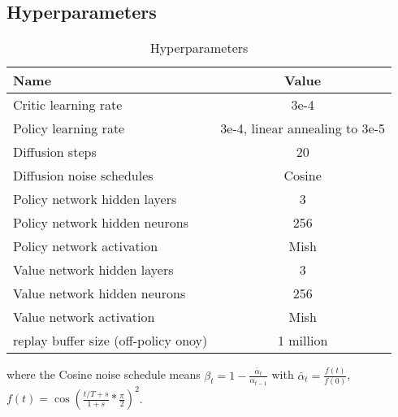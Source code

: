 \subsection{Hyperparameters}
\label{sec:params}
\begin{table}[h]
    \centering
    \caption{Hyperparameters}
    \begin{tabular}{l|c}
    \toprule
      \textbf{Name}   & \textbf{Value} \\
      \midrule
      Critic learning rate & 3e-4 \\
      Policy learning rate & 3e-4, linear annealing to 3e-5\\
      Diffusion steps & 20\\
      Diffusion noise schedules & Cosine \\
      Policy network hidden layers & 3\\
      Policy network hidden neurons & 256\\
      Policy network activation & Mish\\
      Value network hidden layers & 3\\
      Value network hidden neurons & 256\\
      Value network activation & Mish\\
      replay buffer size (off-policy onoy) & 1 million\\
         \bottomrule
    \end{tabular}
    \label{tab:main_hyper}
\end{table}

where the Cosine noise schedule means 
$\beta_t = 1 - \frac{\bar\alpha_t}{\alpha_{t-1}}$ with $\bar{\alpha}_t=\frac{f(t)}{f(0)}$, $f(t)=\cos \left(\frac{t / T+s}{1+s} * \frac{\pi}{2}\right)^2$.




